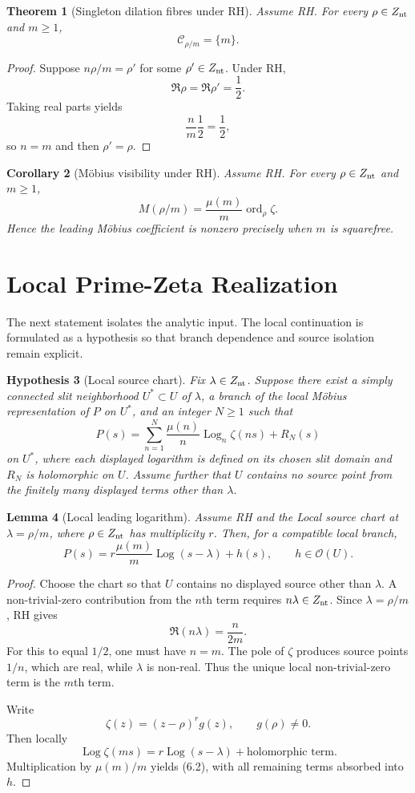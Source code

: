 \documentclass[11pt,a4paper]{article}
\newtheorem{theorem}{Theorem}[section]
\newtheorem{corollary}[theorem]{Corollary}
\newtheorem{lemma}[theorem]{Lemma}
\newtheorem{hypothesis}[theorem]{Hypothesis}
\theoremstyle{remark}
\newcommand{\ord}{\operatorname{ord}}
\newcommand{\Log}{\operatorname{Log}}
\begin{document}
\begin{theorem}[Singleton dilation fibres under RH]
Assume RH. For every $\rho\in Z_{\rm nt}$ and $m\ge1$,
\[
\boxed{\mathcal C_{\rho/m}=\{m\}.}
\tag{5.1}
\]
\end{theorem}

\begin{proof}
Suppose $n\rho/m=\rho'$ for some $\rho'\in Z_{\rm nt}$. Under RH,
\[
\Re\rho=\Re\rho'=\frac12.
\]
Taking real parts yields
\[
\frac{n}{m}\frac12=\frac12,
\]
so $n=m$ and then $\rho'=\rho$.
\end{proof}

\begin{corollary}[Möbius visibility under RH]
Assume RH. For every $\rho\in Z_{\rm nt}$ and $m\ge1$,
\[
\boxed{M(\rho/m)=\frac{\mu(m)}m\ord_\rho\zeta.}
\tag{5.2}
\]
Hence the leading Möbius coefficient is nonzero precisely when $m$ is squarefree.
\end{corollary}

\section{Local Prime-Zeta Realization}

The next statement isolates the analytic input. The local continuation is formulated as a hypothesis so that branch dependence and source isolation remain explicit.

\begin{hypothesis}[Local source chart]
Fix $\lambda\in Z_{\rm nt}$. Suppose there exist a simply connected slit neighborhood $U^\ast\subset U$ of $\lambda$, a branch of the local Möbius representation of $P$ on $U^\ast$, and an integer $N\ge1$ such that
\[
P(s)=\sum_{n=1}^{N}\frac{\mu(n)}n\Log_n\zeta(ns)+R_N(s)
\tag{6.1}
\]
on $U^\ast$, where each displayed logarithm is defined on its chosen slit domain and $R_N$ is holomorphic on $U$.
Assume further that $U$ contains no source point from the finitely many displayed terms other than $\lambda$.
\end{hypothesis}

\begin{lemma}[Local leading logarithm]
Assume RH and the Local source chart at $\lambda=\rho/m$, where $\rho\in Z_{\rm nt}$ has multiplicity $r$. Then, for a compatible local branch,
\[
\boxed{P(s)=r\frac{\mu(m)}m\Log(s-\lambda)+h(s),\qquad h\in\mathcal O(U).}
\tag{6.2}
\]
\end{lemma}

\begin{proof}
Choose the chart so that $U$ contains no displayed source other than $\lambda$. A non-trivial-zero contribution from the $n$th term requires $n\lambda\in Z_{\rm nt}$. Since $\lambda=\rho/m$, RH gives
\[
\Re(n\lambda)=\frac{n}{2m}.
\]
For this to equal $1/2$, one must have $n=m$. The pole of $\zeta$ produces source points $1/n$, which are real, while $\lambda$ is non-real. Thus the unique local non-trivial-zero term is the $m$th term.

Write
\[
\zeta(z)=(z-\rho)^r g(z),\qquad g(\rho)\ne0.
\]
Then locally
\[
\Log\zeta(ms)=r\Log(s-\lambda)+\text{holomorphic term}.
\]
Multiplication by $\mu(m)/m$ yields (6.2), with all remaining terms absorbed into $h$.
\end{proof}
\end{document}

